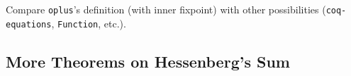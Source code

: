 






\begin{project}
Compare \texttt{oplus}'s definition (with inner fixpoint) with other possibilities
(\texttt{coq-equations}, \texttt{Function}, etc.).
\end{project}
\subsection{More Theorems on Hessenberg's Sum}

